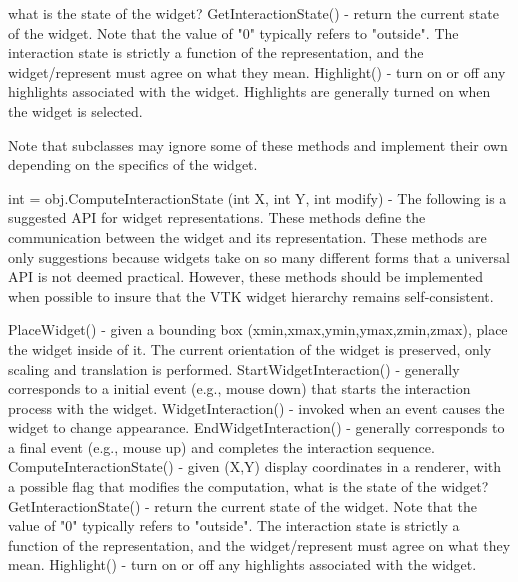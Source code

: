 \begin{DoxyItemize}
\begin{DoxyPre}
                             what is the state of the widget?
 GetInteractionState() - return the current state of the widget. Note that the
                         value of "0" typically refers to "outside". The 
                         interaction state is strictly a function of the
                         representation, and the widget/represent must agree
                         on what they mean.
 Highlight() - turn on or off any highlights associated with the widget.
               Highlights are generally turned on when the widget is selected.
 \end{DoxyPre}
 Note that subclasses may ignore some of these methods and implement their own depending on the specifics of the widget.  
\item {\ttfamily int = obj.\-Compute\-Interaction\-State (int X, int Y, int modify)} -\/ The following is a suggested A\-P\-I for widget representations. These methods define the communication between the widget and its representation. These methods are only suggestions because widgets take on so many different forms that a universal A\-P\-I is not deemed practical. However, these methods should be implemented when possible to insure that the V\-T\-K widget hierarchy remains self-\/consistent. 
\begin{DoxyPre}
 PlaceWidget() - given a bounding box (xmin,xmax,ymin,ymax,zmin,zmax), place 
                 the widget inside of it. The current orientation of the widget 
                 is preserved, only scaling and translation is performed.
 StartWidgetInteraction() - generally corresponds to a initial event (e.g.,
                            mouse down) that starts the interaction process
                            with the widget.
 WidgetInteraction() - invoked when an event causes the widget to change 
                       appearance.
 EndWidgetInteraction() - generally corresponds to a final event (e.g., mouse up)
                          and completes the interaction sequence.
 ComputeInteractionState() - given (X,Y) display coordinates in a renderer, with a
                             possible flag that modifies the computation,
                             what is the state of the widget?
 GetInteractionState() - return the current state of the widget. Note that the
                         value of "0" typically refers to "outside". The 
                         interaction state is strictly a function of the
                         representation, and the widget/represent must agree
                         on what they mean.
 Highlight() - turn on or off any highlights associated with the widget.

\end{DoxyPre}
\end{DoxyItemize}
